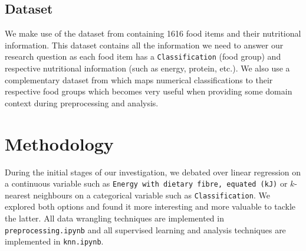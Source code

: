 \documentclass[11pt]{article}
\begin{document}



\subsection{Dataset}
We make use of the dataset from \cite{FoodStandardsAustraliaNewZealand} containing 1616 food items and their nutritional information. This dataset contains all the information we need to answer our research question as each food item has a \verb|Classification| (food group) and respective nutritional information (such as energy, protein, etc.). We also use a complementary dataset from \cite{FoodClassification} which maps numerical classifications to their respective food groups which becomes very useful when providing some domain context during preprocessing and analysis.

\section{Methodology}


During the initial stages of our investigation, we debated over linear regression on a continuous variable such as \verb|Energy with dietary fibre, equated (kJ)| or $k$-nearest neighbours on a categorical variable such as \verb|Classification|. We explored both options and found it more interesting and more valuable to tackle the latter. All data wrangling techniques are implemented in \verb|preprocessing.ipynb| and all supervised learning and analysis techniques are implemented in \verb|knn.ipynb|.
\end{document}
